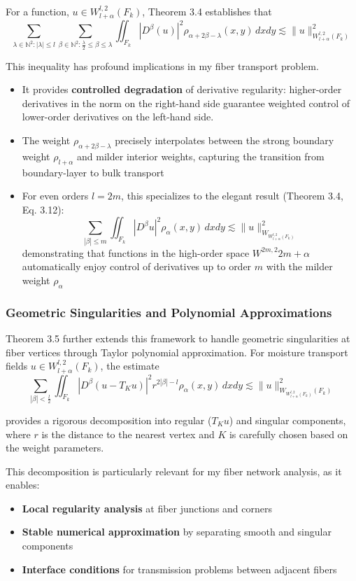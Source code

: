 \documentclass[11pt]{article}
\begin{document}
For a function, $u \in W^{l,2}_{l+\alpha}(F_k)$, Theorem 3.4 establishes that
\[
\sum_{\lambda\in\mathbb{N}^2 : |\lambda|\leq l}\sum_{\beta\in \mathbb{N}^2 : \frac{\lambda}{2}\leq\beta\leq\lambda}\iint_{F_k}|D^\beta(u)|^2\rho_{\alpha+2\beta-\lambda}(x, y) \, dxdy \lesssim \|u\|^2_{W_{{l+\alpha}}^{l, 2}(F_k)}
\]

This inequality has profound implications in my fiber transport problem. 

\begin{itemize}
    \item It provides \textbf{controlled degradation} of derivative regularity: higher-order derivatives in the norm on the right-hand side guarantee weighted control of lower-order derivatives on the left-hand side.
    \item The weight $\rho_{\alpha+2\beta-\lambda}$ precisely interpolates between the strong boundary weight $\rho_{l+\alpha}$ and milder interior weights, capturing the transition from boundary-layer to bulk transport
    \item For even orders $l=2m$, this specializes to the elegant result (Theorem 3.4, Eq. 3.12):
    \[
    \sum_{|\beta|\leq m}\iint_{F_k}|D^\beta u|^2\rho_\alpha(x, y) \, dxdy \lesssim \|u\|^2_{W_{W^{l,2}_{l+\alpha}(F_k)}}
    \]
    demonstrating that functions in the high-order space $W^{2m,2}{2m+\alpha}$ automatically enjoy control of derivatives up to order $m$ with the milder weight $\rho_\alpha$
\end{itemize}

\subsubsection{Geometric Singularities and Polynomial Approximations}

Theorem 3.5 further extends this framework to handle geometric singularities at fiber vertices through Taylor polynomial approximation. For moisture transport fields $u \in W^{l,2}_{l+\alpha}(F_k)$, the estimate
\[
\sum_{|\beta| < \frac{l}{2}}\iint_{F_k} |D^\beta(u - T_Ku)|^2r^{2|\beta|-l}\rho_\alpha(x, y) \, dxdy \lesssim \|u\|^2_{W_{W^{l,2}_{l+\alpha}(F_k)}(F_k)}
\]

provides a rigorous decomposition into regular ($T_K u$) and singular components, where $r$ is the distance to the nearest vertex and $K$ is carefully chosen based on the weight parameters.

This decomposition is particularly relevant for my fiber network analysis, as it enables:
\begin{itemize}
\item \textbf{Local regularity analysis} at fiber junctions and corners
\item \textbf{Stable numerical approximation} by separating smooth and singular components
\item \textbf{Interface conditions} for transmission problems between adjacent fibers
\end{itemize}
\end{document}
